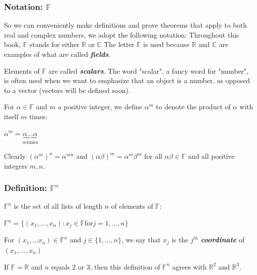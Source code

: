 \documentclass{report}
\begin{document}
\subsubsection{Notation: $\mathbb{F}$}
So we can conveniently make definitions and prove theorems that apply to both real and complex numbers, we adopt the following notation:\newline
Throughout this book, $\mathbb{F}$ stands for either $\mathbb{R}$ or $\mathbb{C}$\newline\newline
The letter $\mathbb{F}$ is used because $\mathbb{R}$ and $\mathbb{C}$ are examples of what are called \textbf{\textit{fields}}.\newline\newline

Elements of $\mathbb{F}$ are called \textbf{\textit{scalars}}. The word "scalar", a fancy word for "number", is often used when we want to emphasize that an object is a number, as opposed to a vector (vectors will be defined soon).\newline\newline

For $\alpha \in \mathbb{F}$ and $m$ a positive integer, we define $\alpha^m$ to denote the product of $\alpha$ with itself $m$ times:\newline
	\centerline{$\alpha^m=\underbrace{\alpha ... \alpha}_{m\text{times}}$}\newline\newline

Clearly $(\alpha^m)^n=\alpha^{mn}$ and $(\alpha\beta)^m=\alpha^m\beta^m$ for all $\alpha\beta \in \mathbb{F}$ and all positive integers $m,n$.

\subsubsection{Definition: $\mathbb{F}^n$}
$\mathbb{F}^n$ is the set of all lists of length $n$ of elements of $\mathbb{F}$:\newline
	\centerline{$\mathbb{F}^n=\{(x_1, ..., x_n):x_j \in \mathbb{F} \text{for} j=1,...,n\}$}\newline
For $(x_1,...x_n) \in \mathbb{F}^n$ and $j \in \{1,...,n\}$, we say that $x_j$ is the $j^{th}$ \textbf{\textit{coordinate}} of $(x_1,...,x_n)$\newline\newline

If $\mathbb{F}=\mathbb{R}$ and $n$ equals 2 or 3, then this definition of $\mathbb{F}^n$ agrees with $\mathbb{R}^2$ and $\mathbb{R}^3$.\newline\newline
\end{document}
